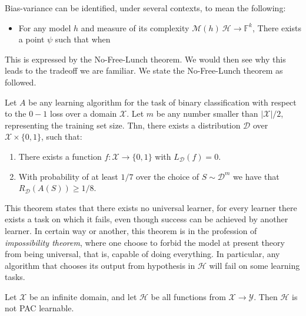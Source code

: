 \begin{conjecture}
    Bias-variance can be identified, under several contexts, to mean the following: \begin{itemize}
        \item For any model $h$ and measure of its complexity $\mathcal{M}(h)\:\mathcal{H}\to \mathbb{F}^{k}$, There exists a point $\psi$ such that when
    \end{itemize}
\end{conjecture}

This is expressed by the No-Free-Lunch theorem. We would then see why this leads to the tradeoff we are familiar. We state the No-Free-Lunch theorem as followed.

\begin{theorem}
    Let $A$ be any learning algorithm for the task of binary classification with respect to the $0-1$ loss over a domain $\mathcal{X}$. Let $m$ be any number smaller than $|\mathcal{X}|/2$, representing the training set size. Thn, there exists a distribution $\mathcal{D}$ over $\mathcal{X}\times \{0,1\}$, such that: 
    \begin{enumerate}
        \item There exists a function $f:\mathcal{X}\to \{0,1\}$ with $L_{\mathcal{D}}(f)= 0$. 
        \item With probability of at least $1/7$ over the choice of $S\sim \mathcal{D}^{m}$ we have that $R_{\mathcal{D}}(A(S))\geq 1/8$. 
    \end{enumerate}
\end{theorem}

This theorem states that there exists no universal learner, for every learner there exists a task on which it fails, even though success can be achieved by another learner. In certain way or another, this theorem is in the profession of \textit{impossibility theorem}, where one choose to forbid the model at present theory from being universal, that is, capable of doing everything. In particular, any algorithm that chooses its output from hypothesis in $\mathcal{H}$ will fail on some learning tasks. 

\begin{col}
    Let $\mathcal{X}$ be an infinite domain, and let $\mathcal{H}$ be all functions from $\mathcal{X}\to \mathcal{Y}$. Then $\mathcal{H}$ is not PAC learnable. 
\end{col}

